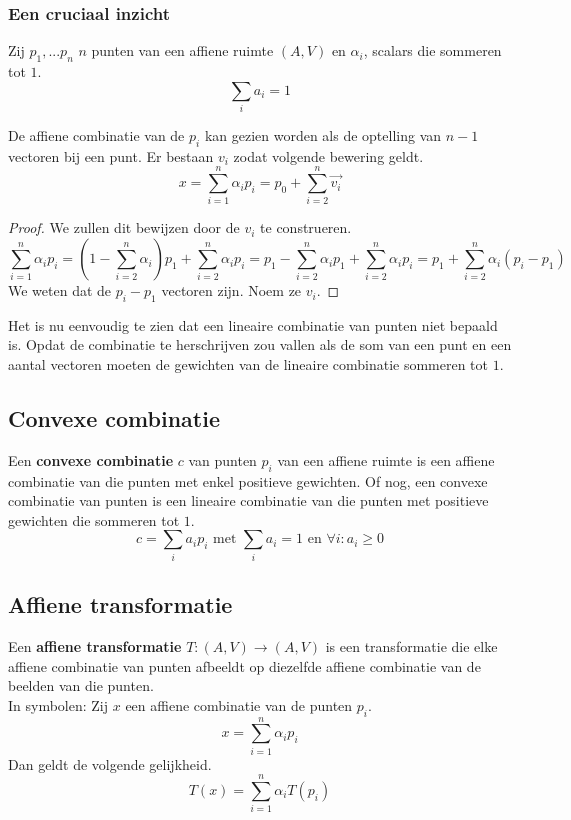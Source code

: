 \documentclass[computergesteund_ontwerp_van_curven_en_oppervlakken.tex]{subfiles}
\begin{document}
\subsubsection{Een cruciaal inzicht}
Zij $p_1,...p_n$ $n$ punten van een affiene ruimte $(A,V)$ en $\alpha_i$, scalars die sommeren tot $1$.
\[
\sum_{i}a_i = 1
\]
\begin{ei}
De affiene combinatie van de $p_i$ kan gezien worden als de optelling van $n-1$ vectoren bij een punt.
Er bestaan $v_i$ zodat volgende bewering geldt.
\[
x = \sum_{i=1}^n\alpha_ip_i = p_0 + \sum_{i=2}^n\vec{v_i}
\]

\begin{proof}
We zullen dit bewijzen door de $v_i$ te construeren.
\[
\sum_{i=1}^n\alpha_ip_i
= \left(1-\sum_{i=2}^n\alpha_i\right)p_1 + \sum_{i=2}^n\alpha_ip_i
= p_1 - \sum_{i=2}^n\alpha_ip_1 + \sum_{i=2}^n\alpha_ip_i
= p_1 + \sum_{i=2}^n\alpha_i(p_i-p_1)
\]
We weten dat de $p_i-p_1$ vectoren zijn. Noem ze $v_i$.
\end{proof}
\end{ei}

Het is nu eenvoudig te zien dat een lineaire combinatie van punten niet bepaald is.
Opdat de combinatie te herschrijven zou vallen als de som van een punt en een aantal vectoren moeten de gewichten van de lineaire combinatie sommeren tot $1$. 

\subsection{Convexe combinatie}
\label{convexe_combinatie}
\begin{de}
Een \textbf{convexe combinatie} $c$ van punten $p_i$ van een affiene ruimte is een affiene combinatie van die punten met enkel positieve gewichten. Of nog, een convexe combinatie van punten is een lineaire combinatie van die punten met positieve gewichten die sommeren tot $1$.
\[
c = \sum_{i}a_ip_i \text{ met } \sum_{i}a_i = 1 \text{ en } \forall i: a_i \ge 0
\]
\end{de}

\subsection{Affiene transformatie}
\label{affiene_transformatie}
\begin{de}
Een \textbf{affiene transformatie} $T: (A,V) \rightarrow (A,V) $ is een transformatie die elke affiene combinatie van punten afbeeldt op diezelfde affiene combinatie van de beelden van die punten.\\
In symbolen: Zij $x$ een affiene combinatie van de punten $p_i$.
\[
x = \sum_{i=1}^{n}\alpha_ip_i
\]
Dan geldt de volgende gelijkheid.
\[
T(x) = \sum_{i=1}^{n}\alpha_iT(p_i)
\]
\end{de}
\end{document}
